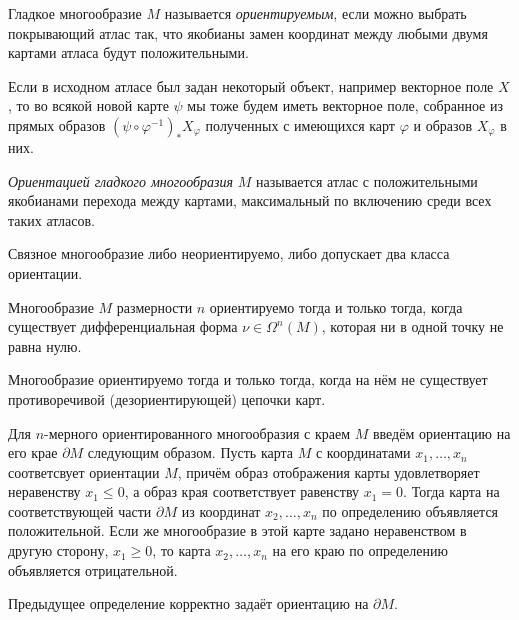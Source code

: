 \begin{to_def} 
    Гладкое многообразие $M$ называется \textit{ориентируемым}, если можно выбрать покрывающий атлас так, что якобианы замен координат между любыми двумя картами атласа будут положительными. 
\end{to_def}

Если в исходном атласе был задан некоторый объект, например векторное поле $X$, то во всякой новой карте $\psi$ мы тоже будем иметь векторное поле, собранное из прямых образов $(\psi  \circ \varphi^{-1})_* X_\varphi$ полученных с имеющихся карт $\varphi$ и образов $X_\varphi$ в них.

\begin{to_def} 
    \textit{Ориентацией гладкого многообразия} $M$ называется атлас с положительными якобианами перехода между картами, максимальный по включению среди всех таких атласов. 
\end{to_def}

\begin{to_lem} 
    Связное многообразие либо неориентируемо, либо допускает два класса ориентации. 
\end{to_lem}

\begin{to_lem} 
    Многообразие $M$ размерности $n$ ориентируемо тогда и только тогда, когда существует дифференциальная форма $\nu \in \Omega^n (M)$, которая ни в одной точку не равна нулю.
\end{to_lem}

\begin{to_lem} 
\label{zorich_cXV.p2.lem4} %
    Многообразие ориентируемо тогда и только тогда, когда на нём не существует противоречивой (дезориентирующей) цепочки карт.
\end{to_lem}

\begin{to_def} 
    Для $n$-мерного ориентированного многообразия с краем $M$ введём ориентацию на его крае $\partial M$ следующим образом. Пусть карта $M$ с координатами $x_1, \ldots, x_n$ соответсвует ориентации $M$, причём образ отображения карты удовлетворяет неравенству $x_1 \leq 0$, а образ края соответствует равенству $x_1 = 0$. Тогда карта на соответствующей части $\partial M$ из координат $x_2, \ldots, x_n$ по определению объявляется положительной. Если же многообразие в этой карте задано неравенством в другую сторону, $x_1 \geq 0$, то карта $x_2, \ldots, x_n$ на его краю по определению объявляется отрицательной. 
\end{to_def}

\begin{to_lem} 
    Предыдущее определение корректно задаёт ориентацию на $\partial M$. 
\end{to_lem}






